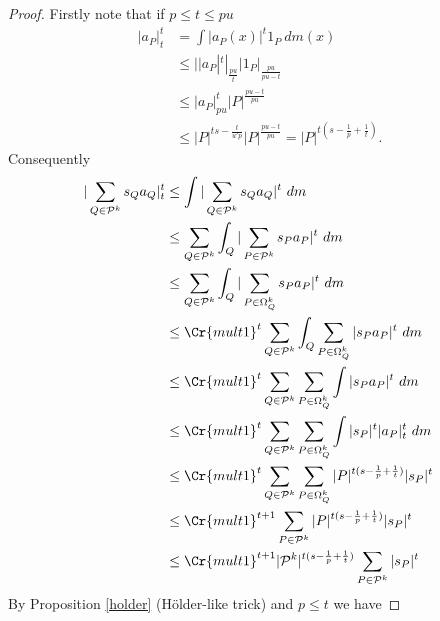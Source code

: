 \documentclass{amsart}
\theoremstyle{definition}
\newcommand{\Crr}[1]{\Cr{#1}}
\begin{document}
\begin{proof}  Firstly note that if $p\leq t \leq  pu$
\begin{align*}  |a_P|^t_t &= \int |a_P(x)|^t  1_P\ dm(x)\\
&\leq  ||a_P|^t|_{\frac{pu}{t}}  |1_P|_{\frac{pu}{pu-t}} \\
&\leq  |a_P|_{pu}^t |P|^{\frac{pu-t}{pu}}\\
&\leq |P|^{ts-\frac{t}{u'p}} |P|^{\frac{pu-t}{pu}} =|P|^{t(s-\frac{1}{p} +\frac{1}{t})}.\end{align*} 
Consequently
\begin{align}
|\sum_{Q \in \mathcal{P}^k}   s_Q a_Q|_t^{t}&\leq   \int |\sum_{Q \in \mathcal{P}^k}   s_Q a_Q|^t \ dm\nonumber \\
&\leq  \sum_{Q \in \mathcal{P}^k}  \int_Q |\sum_{P \in \mathcal{P}^k}   s_P a_P|^t  \ dm \nonumber \\
&\leq   \sum_{Q \in \mathcal{P}^k}  \int_Q |\sum_{P \in \Omega_Q^k}   s_P a_P|^t \ dm \nonumber \\
&\leq  \Crr{mult1}^{t} \sum_{Q \in \mathcal{P}^k}  \int_Q  \sum_{P \in \Omega_Q^k}  |s_P a_P|^t \ dm  \nonumber \\
&\leq  \Crr{mult1}^{t}  \sum_{Q \in \mathcal{P}^k}  \sum_{P \in \Omega_Q^k}  \int   |s_P a_P|^t \ dm \nonumber \\
&\leq \Crr{mult1}^{t}\sum_{Q \in \mathcal{P}^k}  \sum_{P \in \Omega_Q^k} \int  |s_P|^t |a_P|^t_t \ dm \ \nonumber \\
&\leq \Crr{mult1}^{t}   \sum_{Q \in \mathcal{P}^k} \sum_{P \in \Omega_Q^k}   |P|^{t(s-\frac{1}{p} +\frac{1}{t})} |s_P|^t  \nonumber \\
&\leq  \Crr{mult1}^{t+1}  \sum_{P \in \mathcal{P}^k}  |P|^{t(s-\frac{1}{p} +\frac{1}{t})} |s_P|^t   \ \nonumber \\
&\leq \Crr{mult1}^{t+1}  |\mathcal{P}^k|^{t(s-\frac{1}{p} +\frac{1}{t})} \sum_{P \in \mathcal{P}^k} |s_P|^t  \ \nonumber 
\end{align} 
By Proposition \ref{holder} (H\"older-like trick) and $p\leq t$ we have 

\end{proof}
\end{document}
